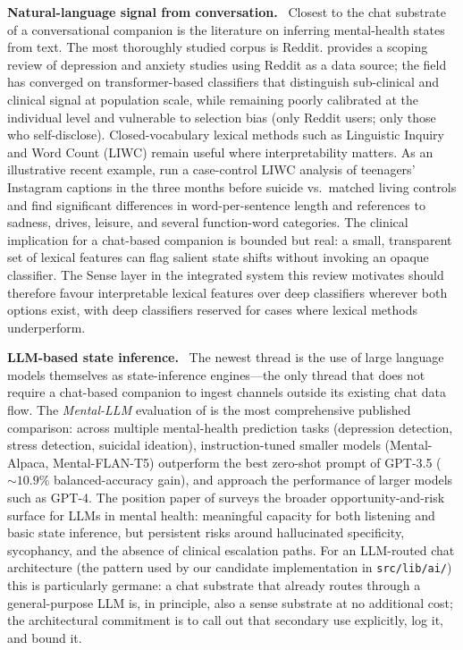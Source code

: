 \documentclass[10pt,conference]{article}
\renewcommand{\paragraph}[1]{\smallskip\par\noindent\textbf{#1}~\ignorespaces}
\begin{document}
\paragraph{Natural-language signal from conversation.}
Closest to the chat substrate of a conversational companion is the
literature on inferring mental-health states from text. The most thoroughly studied corpus is
Reddit. \cite{Boettcher2021RedditMHReview} provides a scoping review of
depression and anxiety studies using Reddit as a data source; the field
has converged on transformer-based classifiers that distinguish
sub-clinical and clinical signal at population scale, while remaining
poorly calibrated at the individual level and vulnerable to selection
bias (only Reddit users; only those who self-disclose).
Closed-vocabulary lexical methods such as Linguistic Inquiry and Word
Count (LIWC) remain useful where interpretability matters. As an
illustrative recent example, \cite{Walker2024InstagramSuicideLIWC} run
a case-control LIWC analysis of teenagers' Instagram captions in the
three months before suicide vs.\ matched living controls and find
significant differences in word-per-sentence length and references to
sadness, drives, leisure, and several function-word categories. The
clinical implication for a chat-based companion is bounded but
real: a small, transparent set of lexical features can flag salient
state shifts without invoking an opaque classifier. The Sense layer in
the integrated system this review motivates should therefore favour
interpretable lexical features over deep classifiers wherever both
options exist, with deep classifiers reserved for cases where lexical
methods underperform.

\paragraph{LLM-based state inference.}
The newest thread is the use of large language models themselves as
state-inference engines---the only thread that does not require a
chat-based companion to ingest channels outside its existing chat
data flow. The
\emph{Mental-LLM} evaluation of \cite{Xu2024MentalLLM} is the most
comprehensive published comparison: across multiple mental-health
prediction tasks (depression detection, stress detection, suicidal
ideation), instruction-tuned smaller models (Mental-Alpaca,
Mental-FLAN-T5) outperform the best zero-shot prompt of GPT-3.5
($\sim\!10.9\%$ balanced-accuracy gain), and approach the performance
of larger models such as GPT-4. The position paper of
\cite{Stade2024LLMOppRisks} surveys the broader opportunity-and-risk
surface for LLMs in mental health: meaningful capacity for both
listening and basic state inference, but persistent risks around
hallucinated specificity, sycophancy, and the absence of clinical
escalation paths. For an LLM-routed chat architecture (the pattern
used by our candidate implementation in \texttt{src/lib/ai/}) this is
particularly germane: a chat substrate that already routes through a
general-purpose LLM is, in principle, also a sense substrate at no
additional cost; the architectural commitment is to call out that
secondary use explicitly, log it, and bound it.
\end{document}
